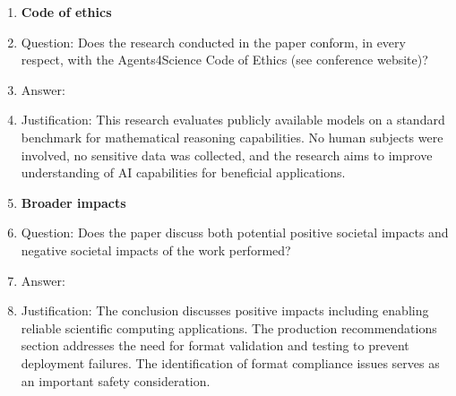 \documentclass{article}
\begin{document}
\begin{enumerate}
\item {\bf Code of ethics}
    \item[] Question: Does the research conducted in the paper conform, in every respect, with the Agents4Science Code of Ethics (see conference website)?
    \item[] Answer: \answerYes{}
    \item[] Justification: This research evaluates publicly available models on a standard benchmark for mathematical reasoning capabilities. No human subjects were involved, no sensitive data was collected, and the research aims to improve understanding of AI capabilities for beneficial applications.

\item {\bf Broader impacts}
    \item[] Question: Does the paper discuss both potential positive societal impacts and negative societal impacts of the work performed?
    \item[] Answer: \answerYes{}
    \item[] Justification: The conclusion discusses positive impacts including enabling reliable scientific computing applications. The production recommendations section addresses the need for format validation and testing to prevent deployment failures. The identification of format compliance issues serves as an important safety consideration.

\end{enumerate}
\end{document}
